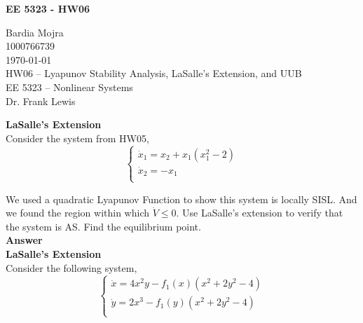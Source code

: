 \documentclass{homeworg}
\begin{document}

\begin{center}
\textbf{EE 5323 - HW06}\\
\end{center}

\noindent
Bardia Mojra\\
1000766739\\
\today\\
HW06 -- Lyapunov Stability Analysis, LaSalle's Extension, and UUB\\
EE 5323 -- Nonlinear Systems\\
Dr. Frank Lewis

\exercise
\noindent
\textbf{LaSalle's Extension}\\
Consider the system from HW05,
\begin{equation*}
  \begin{cases}
    \dot{x}_1 = x_2 + x_1 (x_1^2 -2 )\\
    \dot{x}_2 = -x_1\\
  \end{cases}
\end{equation*}

We used a quadratic Lyapunov Function to show this system is locally SISL.
And we found the region within which \(\dot{V} \leq 0\).
Use LaSalle’s extension to verify that the system is AS. Find the
equilibrium point.\\

\noindent
\textbf{Answer} \\


\exercise
\noindent
\textbf{LaSalle's Extension}\\
Consider the following system,
\begin{equation*}
  \begin{cases}
    \dot{x} = 4 x^2 y - f_1 (x) \left( x^2 + 2 y^2 -4  \right)\\
    \dot{y} = 2 x^3 - f_1 (y) \left( x^2 + 2 y^2 -4  \right)\\
  \end{cases}
\end{equation*}
\end{document}
